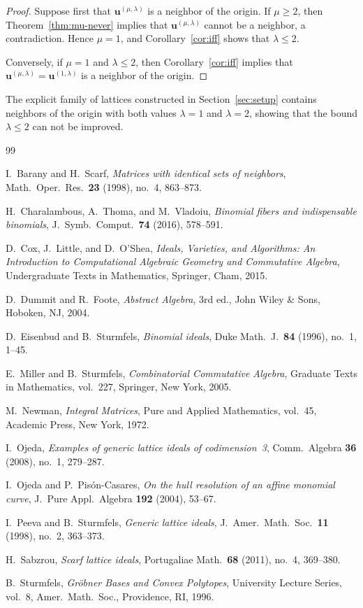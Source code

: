 \documentclass[12pt,a4paper]{amsart}
\theoremstyle{definition}
\begin{document}
\begin{proof}
Suppose first that
$\mathbf u^{(\mu,\lambda)}$
is a neighbor of the origin.
If $\mu\ge2$, then
Theorem~\ref{thm:mu-never}
implies that
$\mathbf u^{(\mu,\lambda)}$
cannot be a neighbor, a contradiction.
Hence $\mu=1$, and
Corollary~\ref{cor:iff}
shows that $\lambda\le2$.

Conversely, if $\mu=1$ and $\lambda\le2$, then
Corollary~\ref{cor:iff}
implies that
$\mathbf u^{(\mu,\lambda)}
=
\mathbf u^{(1,\lambda)}$
is a neighbor of the origin.
\end{proof}

The explicit family of lattices constructed in
Section~\ref{sec:setup} contains neighbors of the origin
with both values $\lambda=1$ and $\lambda=2$,
showing that the bound $\lambda\le2$ can not be improved.

\begin{thebibliography}{99}

I.~Barany and H.~Scarf, \textit{Matrices with identical sets of neighbors},
Math.\ Oper.\ Res.\ \textbf{23} (1998), no.~4, 863--873.

 H.~Charalambous, A.~Thoma, and M.~Vladoiu, \textit{Binomial fibers and indispensable binomials}, J.\ Symb.\ Comput.\ \textbf{74} (2016), 578--591.

D.~Cox, J.~Little, and D.~O'Shea, \textit{Ideals, Varieties, and Algorithms: An Introduction to Computational Algebraic Geometry and Commutative Algebra},
Undergraduate Texts in Mathematics,
Springer, Cham, 2015.

D.~Dummit and R.~Foote, \textit{Abstract Algebra},
3rd ed.,
John Wiley \& Sons, Hoboken, NJ, 2004.

D.~Eisenbud and B.~Sturmfels, \textit{Binomial ideals},
Duke Math.\ J.\ \textbf{84} (1996), no.~1, 1--45.

E.~Miller and B.~Sturmfels, \textit{Combinatorial Commutative Algebra},
Graduate Texts in Mathematics, vol.~227,
Springer, New York, 2005.

M.~Newman, \textit{Integral Matrices},
Pure and Applied Mathematics, vol.~45,
Academic Press, New York, 1972.

I.~Ojeda, \textit{Examples of generic lattice ideals of codimension~3},
Comm.\ Algebra \textbf{36} (2008), no.~1, 279--287.

I.~Ojeda and P.~Pis\'on-Casares, \textit{On the hull resolution of an affine monomial curve}, J.~Pure Appl.\ Algebra \textbf{192} (2004), 53--67.

I.~Peeva and B.~Sturmfels, \textit{Generic lattice ideals},
J.~Amer.\ Math.\ Soc.\ \textbf{11} (1998), no.~2, 363--373.

H.~Sabzrou, \textit{Scarf lattice ideals},
Portugaliae Math.\ \textbf{68} (2011), no.~4, 369--380.

B.~Sturmfels, \textit{Gr\"obner Bases and Convex Polytopes},
University Lecture Series, vol.~8,
Amer.\ Math.\ Soc., Providence, RI, 1996.

\end{thebibliography}
\end{document}
